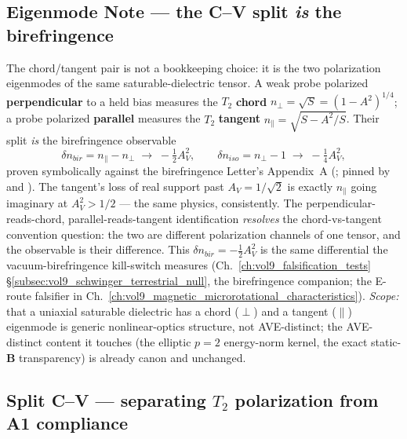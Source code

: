 \subsection{Eigenmode Note --- the C--V split \emph{is} the birefringence}
\label{subsec:vol9_cv_eigenmode_note}

The chord/tangent pair is not a bookkeeping choice: it is the two polarization
eigenmodes of the same saturable-dielectric tensor. A weak probe polarized
\textbf{perpendicular} to a held bias measures the $T_2$ \textbf{chord}
$n_\perp = \sqrt{S} = (1-A^2)^{1/4}$; a probe polarized \textbf{parallel} measures
the $T_2$ \textbf{tangent} $n_\parallel = \sqrt{S - A^2/S}$. Their split \emph{is}
the birefringence observable
\begin{equation}
\delta n_{bir} = n_\parallel - n_\perp \;\to\; -\tfrac12 A_V^2, \qquad
\delta n_{iso} = n_\perp - 1 \;\to\; -\tfrac14 A_V^2,
\label{eq:vol9_cv_birefringence}
\end{equation}
proven symbolically against the birefringence Letter's Appendix~A
(;
pinned by 
and ).
The tangent's loss of real support past $A_V = 1/\sqrt2$ is exactly $n_\parallel$
going imaginary at $A_V^2 > 1/2$ --- the same physics, consistently. The
perpendicular-reads-chord, parallel-reads-tangent identification \emph{resolves}
the chord-vs-tangent convention question: the two are different polarization
channels of one tensor, and the observable is their difference. This
$\delta n_{bir} = -\tfrac12 A_V^2$ is the same differential the vacuum-birefringence
kill-switch measures (Ch.~\ref{ch:vol9_falsification_tests}
\S\ref{subsec:vol9_schwinger_terrestrial_null}, the birefringence companion; the
E-route falsifier in Ch.~\ref{ch:vol9_magnetic_microrotational_characteristics}).
\emph{Scope:} that a uniaxial saturable dielectric has a chord ($\perp$) and a
tangent ($\parallel$) eigenmode is generic nonlinear-optics structure, not
AVE-distinct; the AVE-distinct content it touches (the elliptic $p=2$ energy-norm
kernel, the exact static-$\mathbf B$ transparency) is already canon and unchanged.

\subsection{Split C--V --- separating $T_2$ polarization from A1 compliance}
\label{subsec:vol9_cv_split}

